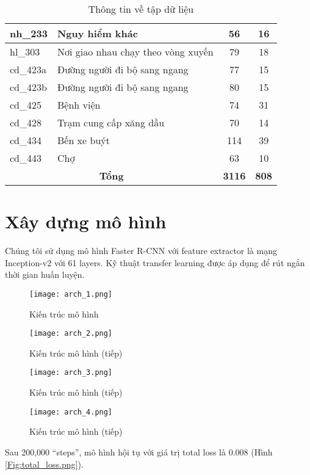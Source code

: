 \documentclass[../thesis.tex]{subfiles}
\begin{document}
\begin{table}[H]
\begin{longtable}{| l | l | c | c |}
	nh\_233 & Nguy hiểm khác & 56 & 16\\
	\hline
	hl\_303 & Nơi giao nhau chạy theo vòng xuyến & 79 & 18\\
	\hline
	cd\_423a & Đường người đi bộ sang ngang & 77 & 15\\
	\hline
	cd\_423b & Đường người đi bộ sang ngang & 80 & 15\\
	\hline
	cd\_425 & Bệnh viện & 74 & 31\\
	\hline
	cd\_428 & Trạm cung cấp xăng dầu & 70 & 14\\
	\hline
	cd\_434 & Bến xe buýt & 114 & 39\\
	\hline
	cd\_443 & Chợ & 63 & 10\\
	\hline
	\multicolumn{2}{|c|}{\textbf{Tổng}} & \textbf{3116} & \textbf{808}\\
	\hline
\end{longtable}
\caption{Thông tin về tập dữ liệu}
\label{Table:datset}
\end{table}

\section{Xây dựng mô hình}

Chúng tôi sử dụng mô hình Faster R-CNN với feature extractor là mạng Inception-v2 với 61 layers. Kỹ thuật transfer learning được áp dụng để rút ngắn thời gian huấn luyện. 

\begin{figure}[H]
	\centering
	\texttt{[image: arch\_1.png]}
	\caption{Kiến trúc mô hình}\label{Fig:arch_1}
\end{figure}

\begin{figure}[H]
	\centering
	\texttt{[image: arch\_2.png]}
	\caption{Kiến trúc mô hình (tiếp)}\label{Fig:arch_2}
\end{figure}

\begin{figure}[H]
	\centering
	\texttt{[image: arch\_3.png]}
	\caption{Kiến trúc mô hình (tiếp)}\label{Fig:arch_3}
\end{figure}

\begin{figure}[H]
	\centering
	\texttt{[image: arch\_4.png]}
	\caption{Kiến trúc mô hình (tiếp)}\label{Fig:arch_4}
\end{figure}

Sau 200,000 ``steps'', mô hình hội tụ với giá trị total loss là 0.008 (Hình \ref{Fig:total_loss.png}).
\end{document}
